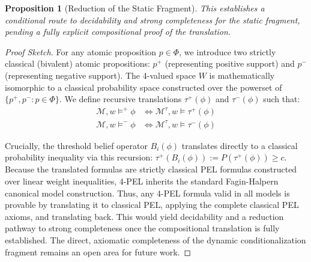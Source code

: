 \documentclass[11pt,a4paper]{article}
\newtheorem{proposition}[theorem]{Proposition}
\begin{document}
\begin{proposition}[Reduction of the Static Fragment]
This establishes a conditional route to decidability and strong completeness for the static fragment, pending a fully explicit compositional proof of the translation.
\end{proposition}
\begin{proof}[Proof Sketch]
For any atomic proposition $p \in \Phi$, we introduce two strictly classical (bivalent) atomic propositions: $p^+$ (representing positive support) and $p^-$ (representing negative support). The 4-valued space $W$ is mathematically isomorphic to a classical probability space constructed over the powerset of $\{p^+, p^- : p \in \Phi\}$. 
We define recursive translations $\tau^+(\phi)$ and $\tau^-(\phi)$ such that:
\begin{align*}
\mathcal{M}, w \models^+ \phi &\iff \mathcal{M}^\tau, w \models \tau^+(\phi) \\
\mathcal{M}, w \models^- \phi &\iff \mathcal{M}^\tau, w \models \tau^-(\phi)
\end{align*}

Crucially, the threshold belief operator $B_i(\phi)$ translates directly to a classical probability inequality via this recursion: $\tau^+(B_i(\phi)) := P(\tau^+(\phi)) \ge c$. Because the translated formulas are strictly classical PEL formulas constructed over linear weight inequalities, 4-PEL inherits the standard Fagin-Halpern canonical model construction. Thus, any 4-PEL formula valid in all models is provable by translating it to classical PEL, applying the complete classical PEL axioms, and translating back. This would yield decidability and a reduction pathway to strong completeness once the compositional translation is fully established. The direct, axiomatic completeness of the dynamic conditionalization fragment remains an open area for future work.
\end{proof}
\end{document}
